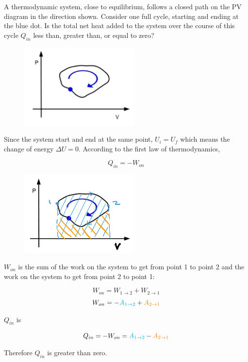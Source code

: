 \documentclass[12pt, a4paper]{article}
\newcounter{exa}
\begin{document}
\begin{texample}
A thermodynamic system, close to equilibrium, follows a closed path on the PV diagram in the direction shown. Consider one full cycle, starting and ending at the blue dot. Is the total net heat added to the system over the course of this cycle \(Q_{in}\) less than, greater than, or equal to zero?

\begin{figure}[H]
\centering
\includegraphics[width=60mm]{25.png}
\end{figure}

Since the system start and end at the same point, \(U_i=U_f\) which means the change of energy \(\Delta U=0\). According to the first law of thermodynamics,

\[ Q_{in}=-W_{on} \]

\begin{figure}[H]
\centering
\includegraphics[width=60mm]{26.png}
\end{figure}

\(W_{on}\) is the sum of the work on the system to get from point 1 to point 2 and the work on the system to get from point 2 to point 1:

\[W_{on}=W_{1\to2}+W_{2\to1}\]
\[W_{on}=-\textcolor{cyan}{A_{1\to2}}+\textcolor{orange}{A_{2\to1}}\]

$Q_{in}$ is

\[ Q_{in}=-W_{on}=\textcolor{cyan}{A_{1\to2}}-\textcolor{orange}{A_{2\to1}} \]

Therefore \(Q_{in}\) is greater than zero.
\end{texample}
\end{document}
